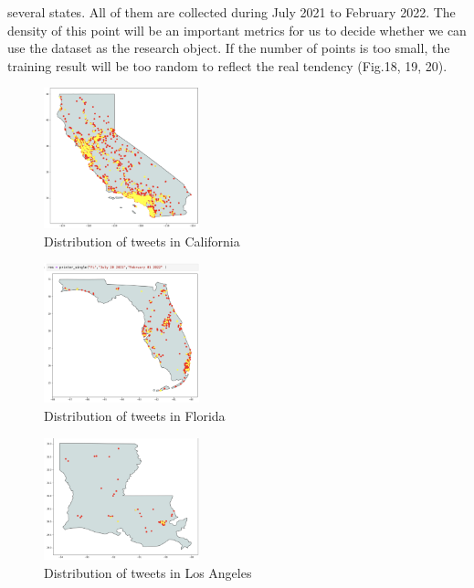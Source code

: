 several states. All of them are collected during July 2021 to February 2022.
The density of this point will be an important metrics for us to decide
whether we can use the dataset as the research object. If the number of
points is too small, the training result will be too random to reflect the
real tendency (Fig.18, 19, 20). 
\begin{figure}[h]
    \centering
    \includegraphics[width=0.4\textwidth]{imgs/CA.png}
    \caption{\label{fig:Research process}Distribution of tweets in California}
\end{figure}
\begin{figure}[h]
    \centering
    \includegraphics[width=0.4\textwidth]{imgs/FL.png}
    \caption{\label{fig:Research process}Distribution of tweets in Florida}
\end{figure}
\begin{figure}[h]
    \centering
    \includegraphics[width=0.4\textwidth]{imgs/LA.png}
    \caption{\label{fig:Research process}Distribution of tweets in Los Angeles}
\end{figure}